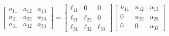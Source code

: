 \documentclass[preview]{standalone}
\begin{document}
\[ 
    \begin{bmatrix} 
      a_{11} & a_{12} & a_{13} \\ 
      a_{21} & a_{22} & a_{23} \\ 
      a_{31} & a_{32} & a_{33} 
    \end{bmatrix} = 
    \begin{bmatrix} 
      \ell_{11} &         0 & 0         \\ 
      \ell_{21} & \ell_{22} & 0         \\ 
      \ell_{31} & \ell_{32} & \ell_{33} 
    \end{bmatrix} 
    \begin{bmatrix} 
      u_{11} & u_{12} & u_{13} \\ 
           0 & u_{22} & u_{23} \\ 
           0 &      0 & u_{33} 
    \end{bmatrix} 
 \] 
\end{document}
